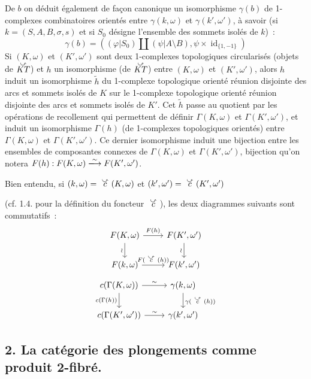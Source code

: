 De $b$ on déduit également de façon canonique un isomorphisme $\gamma(b)$ de 1-complexes combinatoires orientés entre $\gamma(k,\omega)$ et $\gamma(k',\omega')$, à savoir (si $k = (S,A,B,\sigma,s)$ et si $S_0$ désigne l'ensemble des sommets isolés de $k$)~:
$$
\gamma(b) = ((\varphi|{S_0}) \amalg (\psi|{A \setminus B}), \psi \times \operatorname{id}_{\{ 1,-1 \}})
$$
Si $(K,\omega)$ et $(K',\omega')$ sont deux 1-complexes topologiques circularisés (objets de $\curvedarrow{KT}$) et $h$ un isomorphisme (de $\curvedarrow{KT}$) entre $(K, \omega)$ et $(K', \omega')$, alors $h$ induit un isomorphisme $\tilde{h}$ du 1-complexe topologique orienté réunion disjointe des arcs et sommets isolés de $K$ sur le 1-complexe topologique orienté réunion disjointe des arcs et sommets isolés de $K'$. Cet $\tilde{h}$ passe au quotient par les opérations de recollement qui permettent de définir $\Gamma(K,\omega)$ et $\Gamma(K',\omega')$, et induit un isomorphisme $\Gamma(h)$ (de 1-complexes topologiques orientés) entre $\Gamma(K,\omega)$ et $\Gamma(K',\omega')$. Ce dernier isomorphisme induit une bijection entre les ensembles de composantes connexes de $\Gamma(K,\omega)$ et $\Gamma(K',\omega')$, bijection qu'on notera $F(h) : F(K,\omega) \isommap F(K',\omega')$.

Bien entendu, si $(k,\omega) = \curvedarrow{c}(K,\omega)$ et $(k',\omega') = \curvedarrow{c}(K',\omega')$ 

(cf. 1.4. pour la définition du foncteur $\curvedarrow{c}$), les deux diagrammes suivants sont commutatifs~:
\[\begin{tikzcd}
	{F(K, \omega)} & {F(K',\omega')} \\
	{F(k,\omega)} & {F(k',\omega')}
	\arrow["{F(h)}", from=1-1, to=1-2]
	\arrow["\wr"', from=1-1, to=2-1]
	\arrow["\wr"', from=1-2, to=2-2]
	\arrow["{F(\curvedarrow{c}(h))}", from=2-1, to=2-2]
\end{tikzcd}\]
\[\begin{tikzcd}
	{c(\Gamma(K,\omega))} & {\gamma(k,\omega)} \\
	{c(\Gamma(K',\omega'))} & {\gamma(k',\omega')}
	\arrow["\sim", from=1-1, to=1-2]
	\arrow["{c(\Gamma(h))}"', from=1-1, to=2-1]
	\arrow["{\gamma(\curvedarrow{c}(h))}", from=1-2, to=2-2]
	\arrow["\sim", from=2-1, to=2-2]
\end{tikzcd}\]

\subsection*{2. La catégorie des plongements comme produit 2-fibré.}

